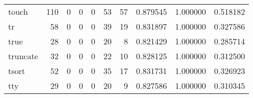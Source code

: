 \begin{tabular}{lrrrrrrrrr}
touch     &                                       110 &                                                  0 &                                                  0 &                                                  0 &                                                 53 &                                                 57 &                                           0.879545 &                               1.000000 &                             0.518182 \\
tr        &                                        58 &                                                  0 &                                                  0 &                                                  0 &                                                 39 &                                                 19 &                                           0.831897 &                               1.000000 &                             0.327586 \\
true      &                                        28 &                                                  0 &                                                  0 &                                                  0 &                                                 20 &                                                  8 &                                           0.821429 &                               1.000000 &                             0.285714 \\
truncate  &                                        32 &                                                  0 &                                                  0 &                                                  0 &                                                 22 &                                                 10 &                                           0.828125 &                               1.000000 &                             0.312500 \\
tsort     &                                        52 &                                                  0 &                                                  0 &                                                  0 &                                                 35 &                                                 17 &                                           0.831731 &                               1.000000 &                             0.326923 \\
tty       &                                        29 &                                                  0 &                                                  0 &                                                  0 &                                                 20 &                                                  9 &                                           0.827586 &                               1.000000 &                             0.310345 \\

\end{tabular}
